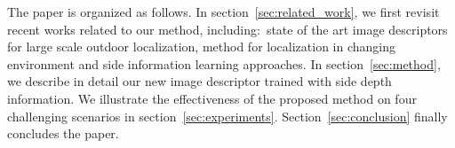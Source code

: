 The paper is organized as follows. In section~\ref{sec:related_work}, we first revisit recent works related to our method, including:~state of the art image descriptors for large scale outdoor localization, method for localization in changing environment and side information learning approaches. In section~\ref{sec:method}, we describe in detail our new image descriptor trained with side depth information. We illustrate the effectiveness of the proposed method on four challenging scenarios in section~\ref{sec:experiments}. Section~\ref{sec:conclusion} finally concludes the paper.